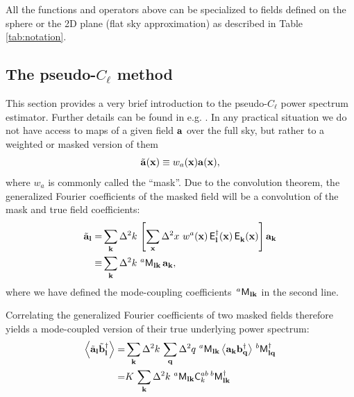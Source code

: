 \documentclass[a4paper,11pt]{article}
\newcommand{\summ}[1]{\sum_{\bf #1}\Delta^2 #1\,}
\newcommand{\Ylm}[3]{{\sf E}^{#1}_{\bf #2}({\bf #3})}
\begin{document}
      All the functions and operators above can be specialized to fields defined on the sphere or the 2D plane (flat sky approximation) as described in Table \ref{tab:notation}.

    \subsection{The pseudo-$C_\ell$ method}\label{ssec:theory.pcl}
      This section provides a very brief introduction to the pseudo-$C_\ell$ power spectrum estimator. Further details can be found in e.g. \cite{2002ApJ...567....2H,2005MNRAS.360.1262B,2019MNRAS.484.4127A}. 
      In any practical situation we do not have access to maps of a given field ${\bf a}$ over the full sky, but rather to a weighted or masked version of them
      \begin{equation}
        \tilde{\bf a}({\bf x})\equiv w_a({\bf x}){\bf a}({\bf x}),
        \label{eq:mask}
      \end{equation}
      where $w_a$ is commonly called the ``mask''. Due to the convolution theorem, the generalized Fourier coefficients of the masked field will be a convolution of the mask and true field coefficients:
      \begin{align}\nonumber
        \tilde{\bf a}_{\bf l}=&\summ{k}\left[\summ{x}\,w^a({\bf x})\,\Ylm{\dag}{l}{x}\,\Ylm{}{k}{x}\right]{\bf a}_{\bf k}\\
                        \equiv&\summ{k}\,^a{\sf M}_{{\bf l}{\bf k}}\,{\bf a}_{\bf k},
      \end{align}
      where we have defined the mode-coupling coefficients $\,^a{\sf M}_{{\bf l}{\bf k}}$ in the second line.
    
      Correlating the generalized Fourier coefficients of two masked fields therefore yields a mode-coupled version of their true underlying power spectrum:
      \begin{align}\nonumber
        \left\langle\tilde{\bf a}_{\bf l}\tilde{\bf b}^\dag_{\bf l}\right\rangle=&\summ{k}\summ{q}\,^a{\sf M}_{{\bf l}{\bf k}}\left\langle{\bf a}_{\bf k}{\bf b}^\dag_{\bf q}\right\rangle\,^b{\sf M}^\dag_{{\bf l}{\bf q}}\\
                                                                              =&K\,\summ{k}\,^a{\sf M}_{{\bf l}{\bf k}}{\sf C}^{ab}_k\,^b{\sf M}^\dag_{{\bf l}{\bf k}} \label{eq:M}                                                                             
      \end{align}
    
\end{document}
